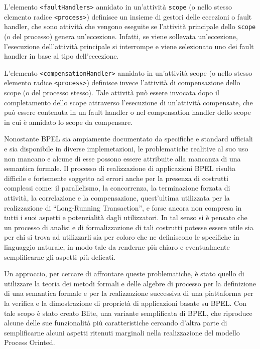 L'elemento \texttt{<faultHandlers>} annidato in un'attività \texttt{scope} (o
nello stesso elemento radice \texttt{<process>}) definisce un insieme di gestori
delle eccezioni o fault handler, che sono attività che vengono eseguite se
l'attività principale dello \texttt{scope} (o del processo) genera un'eccezione.
Infatti, se viene sollevata un'eccezione, l'esecuzione dell'attività principale si
interrompe e viene selezionato uno dei fault handler in base al tipo
dell'eccezione.

L'elemento \texttt{<compensationHandler>} annidato in un'attività scope (o
nello stesso elemento radice \texttt{<process>}) definisce invece l'attività di
compensazione dello scope (o del processo stesso). Tale attività può essere
invocata dopo il completamento dello scope attraverso l'esecuzione di
un'attività compensate, che può essere contenuta in un fault handler o nel
compensation handler dello scope in cui è annidato lo scope da compensare.



\vspace{1cm}
Nonostante BPEL sia ampiamente documentato da specifiche e standard ufficiali e
sia disponibile in diverse implemetazioni, le problematiche realitive al suo
uso non mancano e alcune di esse possono essere attribuite alla
mancanza di una semantica formale. Il processo di realizzazione di applicazioni BPEL
risulta difficile e fortemente soggetto ad errori anche per la presenza di
costrutti complessi come: il parallelismo, la concorrenza, la terminazione
forzata di attività, la correlazione e la compensazione, quest'ultima utilizzata
per la realizzazione di ``Long-Running Transaction'', e forse ancora non 
compresa in tutti i suoi aspetti e potenzialità dagli utilizzatori. In tal
senso si è pensato che un processo di analisi e di formalizzazione di
tali costrutti potesse essere utile sia per chi si trova ad utilizzarli sia per
coloro che ne definiscono le specifiche in linguaggio naturale, in modo tale da
renderne più chiaro e eventualmente semplificarne gli aspetti più delicati.

Un approccio, per cercare di affrontare queste problematiche, è stato quello di
utilizzare la teoria dei metodi formali e delle algebre di processo per la
definizione di una semantica formale e per la realizzazione successiva di una
piattaforma per la verifica e la dimostrazione di proprietà di applicazioni
basate su BPEL. Con tale scopo è stato creato Blite, una variante semplificata di
BPEL, che riproduce alcune delle sue funzionalità più caratteristiche cercando
d'altra parte di semplificarne alcuni aspetti ritenuti marginali nella
realizzazione del modello Process Orinted.
\\   

